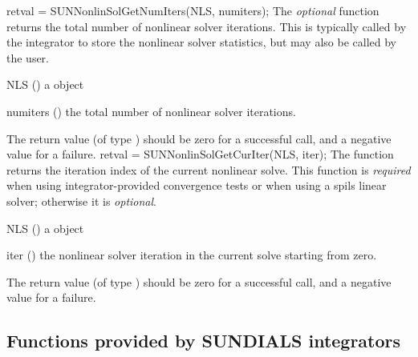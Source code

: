 {
  retval = SUNNonlinSolGetNumIters(NLS, numiters);
}
{
  The \textit{optional} function  returns
  the total number of nonlinear solver iterations. This is typically
  called by the {\sundials} integrator to store the nonlinear solver
  statistics, but may also be called by the user.
}
{
  \begin{args}[numiters]
  \item[NLS] ()
    a {\sunnonlinsol} object
  \item[numiters] ()
    the total number of nonlinear solver iterations.
  \end{args}
}
{
  The return value  (of type ) should be zero for a
  successful call, and a negative value for a failure.
}
{}
{
  retval = SUNNonlinSolGetCurIter(NLS, iter);
}
{
  The function  returns the iteration index
  of the current nonlinear solve. This function is \textit{required}
  when using {\sundials} integrator-provided convergence tests or
  when using a {\sunlinsol} spils linear solver; otherwise it is 
  \textit{optional}.
}
{
  \begin{args}[numiters]
  \item[NLS] ()
    a {\sunnonlinsol} object
  \item[iter] ()
    the nonlinear solver iteration in the current solve starting from
    zero.
  \end{args}
}
{
  The return value  (of type ) should be zero for a
  successful call, and a negative value for a failure.
}
{}

\subsection{Functions provided by SUNDIALS integrators}
\label{ss:sunnonlinsol_sunsuppliedfn}

